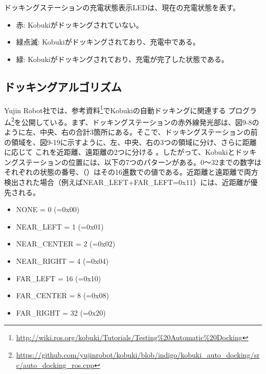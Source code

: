 \begin{itemize}
\begin{exercise}[Kobukiとドッキングステーションの状態表示LED]
  ドッキングステーションの充電状態表示LEDは、現在の充電状態を表す。

  \begin{itemize}
  \item 赤: Kobukiがドッキングされていない。
  \item 緑点滅: Kobukiがドッキングされており、充電中である。
  \item 緑: Kobukiがドッキングされており、充電が完了した状態である。
  \end{itemize}
\end{exercise}

\subsection{ドッキングアルゴリズム}

Yujin Robot社では、参考資料\footnote{\url{http://wiki.ros.org/kobuki/Tutorials/Testing\%20Automatic\%20Docking}}でKobukiの自動ドッキングに関連する  プログラム\footnote{\url{https://github.com/yujinrobot/kobuki/blob/indigo/kobuki\_auto\_docking/src/auto\_docking\_ros.cpp}}を公開している。まず、ドッキングステーションの赤外線発光部は、図9-8のように左、中央、右の合計3箇所にある。そこで、ドッキングステーションの前の領域を、図9-19に示すように、左、中央、右の3つの領域に分け、さらに距離に応じて   これを近距離、遠距離の2つに分ける  。したがって、Kobukiとドッキングステーションの位置には、以下の7つのパターンがある。0～32までの数字はそれぞれの状態の番号、（）はその16進数での値である。近距離と遠距離で両方検出された場合（例えばNEAR\_LEFT+FAR\_LEFT=0x11）には、近距離が優先される。

\begin{itemize}[leftmargin=*]
\item NONE = 0  (=0x00)
\item NEAR\_LEFT = 1 (=0x01)
\item NEAR\_CENTER = 2 (=0x02)
\item NEAR\_RIGHT = 4 (=0x04)
\item FAR\_LEFT = 16 (=0x10)
\item FAR\_CENTER = 8 (=0x08)
\item FAR\_RIGHT = 32 (=0x20)
\end{itemize}


\end{itemize}
